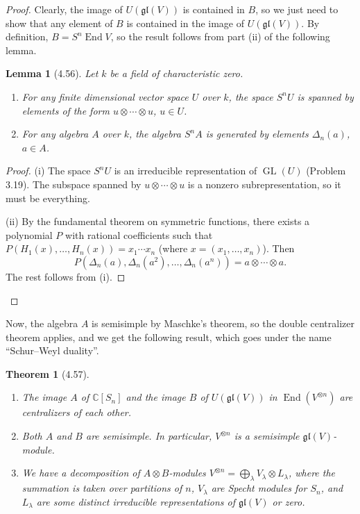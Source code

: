 \documentclass[UTF8,11pt]{ctexart}
\newtheorem*{theorem}{Theorem}
\newtheorem*{lemma}{Lemma}
\theoremstyle{definition}
\newcommand{\C}{\mathbb C}
\begin{document}
\begin{proof}
Clearly, the image of $U(\mathfrak{gl}(V))$ is contained in $B$, so we just need to show that any element of $B$ is contained in the image of $U(\mathfrak{gl}(V))$. By definition, $B=S^n\operatorname{End}V$, so the result follows from part (ii) of the following lemma.
\begin{lemma}[4.56]
Let $k$ be a field of characteristic zero.
\begin{enumerate}[label=(\roman*)]
\item For any finite dimensional vector space $U$ over $k$, the space $S^nU$ is spanned by elements of the form $u\otimes\cdots\otimes u$, $u\in U$.
\item For any algebra $A$ over $k$, the algebra $S^nA$ is generated by elements $\Delta_n(a)$, $a\in A$.
\end{enumerate}
\end{lemma}
\begin{proof}
(i) The space $S^nU$ is an irreducible representation of $\operatorname{GL}(U)$ (Problem 3.19). The subspace spanned by $u\otimes\cdots\otimes u$ is a nonzero subrepresentation, so it must be everything.

(ii) By the fundamental theorem on symmetric functions, there exists a polynomial $P$ with rational coefficients such that $P(H_1(x),\ldots,H_n(x))=x_1\cdots x_n$ (where $x=(x_1,\ldots,x_n)$). Then
\[
P(\Delta_n(a),\Delta_n(a^2),\ldots,\Delta_n(a^n))=a\otimes\cdots\otimes a.
\]
The rest follows from (i).
\end{proof}
\end{proof}
Now, the algebra $A$ is semisimple by Maschke's theorem, so the double centralizer theorem applies, and we get the following result, which goes under the name ``Schur--Weyl duality''.
\begin{theorem}[4.57]
\begin{enumerate}[label=(\roman*)]
\item The image $A$ of $\C[S_n]$ and the image $B$ of $U(\mathfrak{gl}(V))$ in $\operatorname{End}(V^{\otimes n})$ are centralizers of each other.
\item Both $A$ and $B$ are semisimple. In particular, $V^{\otimes n}$ is a semisimple $\mathfrak{gl}(V)$-module.
\item We have a decomposition of $A\otimes B$-modules $V^{\otimes n}=\bigoplus_\lambda V_\lambda\otimes L_\lambda$, where the summation is taken over partitions of $n$, $V_\lambda$ are Specht modules for $S_n$, and $L_\lambda$ are some distinct irreducible representations of $\mathfrak{gl}(V)$ or zero.
\end{enumerate}
\end{theorem}
\end{document}
